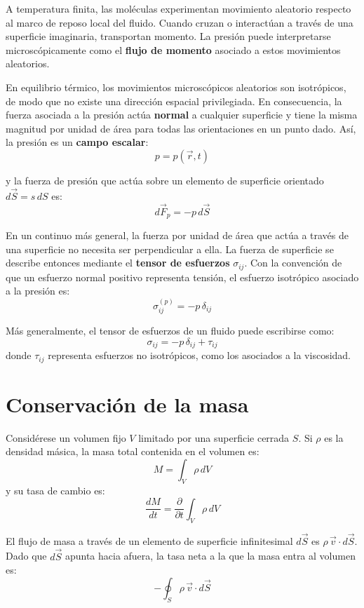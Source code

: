 A temperatura finita, las moléculas experimentan movimiento aleatorio respecto al marco de reposo local del fluido. Cuando cruzan o interactúan a través de una superficie imaginaria, transportan momento. La presión puede interpretarse microscópicamente como el \textbf{flujo de momento} asociado a estos movimientos aleatorios.

En equilibrio térmico, los movimientos microscópicos aleatorios son isotrópicos, de modo que no existe una dirección espacial privilegiada. En consecuencia, la fuerza asociada a la presión actúa \textbf{normal} a cualquier superficie y tiene la misma magnitud por unidad de área para todas las orientaciones en un punto dado. Así, la presión es un \textbf{campo escalar}:
$$
p = p(\vec{r}, t)
$$

y la fuerza de presión que actúa sobre un elemento de superficie orientado $d\vec{S} = \hat{s}\, dS$ es:
$$
d\vec{F}_p = -p\, d\vec{S}
$$

\figuraCeldaPresion

En un continuo más general, la fuerza por unidad de área que actúa a través de una superficie no necesita ser perpendicular a ella. La fuerza de superficie se describe entonces mediante el \textbf{tensor de esfuerzos} $\sigma_{ij}$. Con la convención de que un esfuerzo normal positivo representa tensión, el esfuerzo isotrópico asociado a la presión es:
$$
\sigma^{(p)}_{ij} = -p\,\delta_{ij}
$$

Más generalmente, el tensor de esfuerzos de un fluido puede escribirse como:
$$
\sigma_{ij} = -p\,\delta_{ij} + \tau_{ij}
$$
donde $\tau_{ij}$ representa esfuerzos no isotrópicos, como los asociados a la viscosidad.

\section{Conservación de la masa}

Considérese un volumen fijo $V$ limitado por una superficie cerrada $S$. Si $\rho$ es la densidad másica, la masa total contenida en el volumen es:
$$
M = \int_V \rho\, dV
$$
y su tasa de cambio es:
$$
\frac{dM}{dt} = \frac{\partial}{\partial t}\int_V \rho\, dV
$$

El flujo de masa a través de un elemento de superficie infinitesimal $d\vec{S}$ es $\rho\,\vec{v}\cdot d\vec{S}$. Dado que $d\vec{S}$ apunta hacia afuera, la tasa neta a la que la masa entra al volumen es:
$$
-\oint_S \rho\,\vec{v}\cdot d\vec{S}
$$

